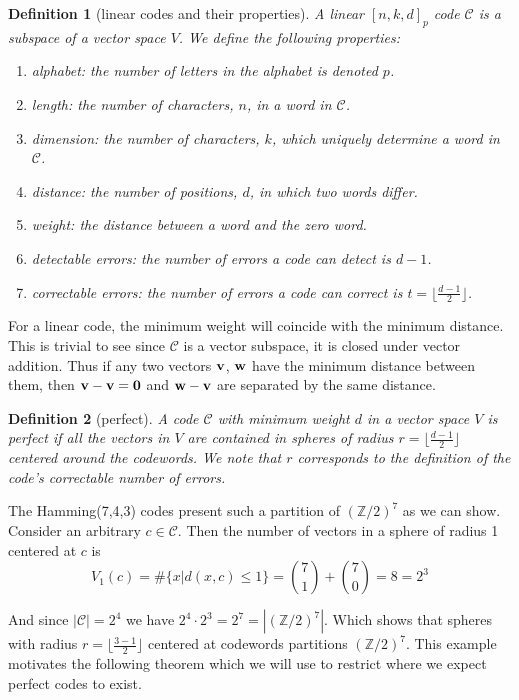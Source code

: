 \documentclass[paper=a4, fontsize=11pt]{scrartcl} %
\numberwithin{equation}{section} %
\numberwithin{figure}{section} %
\numberwithin{table}{section} %
\newtheorem{defn}{Definition}
\begin{document}
\begin{defn}[linear codes and their properties]
A linear $[n,k,d]_p$ code $\mathcal{C}$ is a subspace of a vector space $V$. We define the following properties:
\begin{enumerate}
\item \textit{alphabet}: the number of letters in the alphabet is denoted $p$.
\item \textit{length}: the number of characters, $n$, in a word in $\mathcal{C}$.
\item \textit{dimension}: the number of characters, $k$, which uniquely determine a word in $\mathcal{C}$.
\item \textit{distance}: the number of positions, $d$, in which two words differ.
\item \textit{weight}: the distance between a word and the zero word.
\item \textit{detectable errors}: the number of errors a code can detect is $d-1$.
\item \textit{correctable errors}: the number of errors a code can correct is $t=\lfloor \frac{d-1}{2} \rfloor$.
\end{enumerate} 
\end{defn}

For a linear code, the minimum weight will coincide with the minimum distance. This is trivial to see since $\mathcal{C}$ is a vector subspace, it is closed under vector addition. Thus if any two vectors $\bf{v}$, $\bf{w}$ have the minimum distance between them, then $\bf{v}-\bf{v}=\bf{0}$ and $\bf{w}-\bf{v}$ are separated by the same distance.

\begin{defn}[perfect]
A code $\mathcal{C}$ with minimum weight $d$ in a vector space $V$ is \textit{perfect} if all the vectors in $V$ are contained in spheres of radius $r=\lfloor \frac{d-1}{2} \rfloor$ centered around the codewords. We note that $r$ corresponds to the definition of the code's correctable number of errors.
\end{defn}

The Hamming(7,4,3) codes present such a partition of $(\mathbb{Z}/2)^7$ as we can show. Consider an arbitrary $c \in \mathcal{C}$. Then the number of vectors in a sphere of radius 1 centered at $c$ is
$$
V_1(c) = \#\{x | d(x,c)\leq 1 \} = {7 \choose 1} + {7 \choose 0} = 8 = 2^3
$$

And since $|\mathcal{C}|= 2^4$ we have $2^4 \cdot 2^3 = 2^7=|(\mathbb{Z}/2)^7|$. Which shows that spheres with radius $r = \lfloor \frac{3-1}{2} \rfloor$ centered at codewords partitions $(\mathbb{Z}/2)^7$. This example motivates the following theorem which we will use to restrict where we expect perfect codes to exist.
\end{document}
